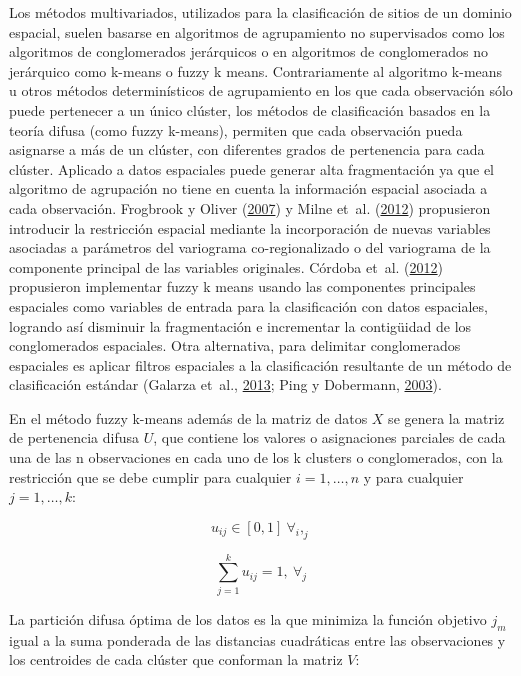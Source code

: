 \documentclass[11pt,b5paper,]{krantz}
\begin{document}
Los métodos multivariados, utilizados para la clasificación de sitios de un dominio espacial, suelen basarse en algoritmos de agrupamiento no supervisados como los algoritmos de conglomerados jerárquicos o en algoritmos de conglomerados no jerárquico como k-means o fuzzy k means. Contrariamente al algoritmo k-means u otros métodos determinísticos de agrupamiento en los que cada observación sólo puede pertenecer a un único clúster, los métodos de clasificación basados en la teoría difusa (como fuzzy k-means), permiten que cada observación pueda asignarse a más de un clúster, con diferentes grados de pertenencia para cada clúster. Aplicado a datos espaciales puede generar alta fragmentación ya que el algoritmo de agrupación no tiene en cuenta la información espacial asociada a cada observación. Frogbrook y Oliver (\protect\hyperlink{ref-Frogbrook_Oliver_2007}{2007}) y Milne et~al. (\protect\hyperlink{ref-Milne_Webster_Ginsburg_Kindred_2012}{2012}) propusieron introducir la restricción espacial mediante la incorporación de nuevas variables asociadas a parámetros del variograma co-regionalizado o del variograma de la componente principal de las variables originales. Córdoba et~al. (\protect\hyperlink{ref-Cuxf3rdoba_Balzarini_Bruno_Costa_Balzarini_Costa_2012}{2012}) propusieron implementar fuzzy k means usando las componentes principales espaciales como variables de entrada para la clasificación con datos espaciales, logrando así disminuir la fragmentación e incrementar la contigüidad de los conglomerados espaciales. Otra alternativa, para delimitar conglomerados espaciales es aplicar filtros espaciales a la clasificación resultante de un método de clasificación estándar (Galarza et~al., \protect\hyperlink{ref-Galarza_Mastaglia_Albornoz_Martux131nez_2013}{2013}; Ping y Dobermann, \protect\hyperlink{ref-Ping_Dobermann_2003}{2003}).

En el método fuzzy k-means además de la matriz de datos \(X\) se genera la matriz de pertenencia difusa \(U\), que contiene los valores o asignaciones parciales de cada una de las n observaciones en cada uno de los k clusters o conglomerados, con la restricción que se debe cumplir para cualquier \(i = 1,\ldots,n\) y para cualquier \(j = 1,\ldots,k\):

\[u_{ij}\in[0,1]\ \forall_i,_j\]

\[\sum_{j=1}^{k}{u_{ij}=1,\ \forall_j}\]

La partición difusa óptima de los datos es la que minimiza la función objetivo \(j_m\) igual a la suma ponderada de las distancias cuadráticas entre las observaciones y los centroides de cada clúster que conforman la matriz \(V\):
\end{document}
